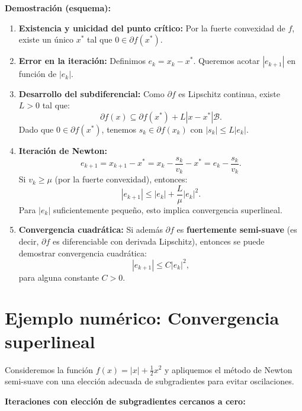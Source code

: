\documentclass[12pt]{book}
\theoremstyle{definition}
\theoremstyle{plain}
\theoremstyle{remark}
\begin{document}
\medskip
\textbf{Demostración (esquema):}

\begin{enumerate}
    \item \textbf{Existencia y unicidad del punto crítico:}
      Por la fuerte convexidad de \( f \), existe un único \( x^* \) tal que \( 0 \in \partial f(x^*) \).

    \item \textbf{Error en la iteración:}
      Definimos \( e_k = x_k - x^* \). Queremos acotar \( |e_{k+1}| \) en función de \( |e_k| \).

    \item \textbf{Desarrollo del subdiferencial:}
      Como \( \partial f \) es Lipschitz continua, existe \( L > 0 \) tal que:
      \[
      \partial f(x) \subseteq \partial f(x^*) + L |x - x^*| \mathcal{B}.
      \]
      Dado que \( 0 \in \partial f(x^*) \), tenemos \( s_k \in \partial f(x_k) \) con \( |s_k| \leq L |e_k| \).

    \item \textbf{Iteración de Newton:}
      \[
      e_{k+1} = x_{k+1} - x^* = x_k - \frac{s_k}{v_k} - x^* = e_k - \frac{s_k}{v_k}.
      \]
      Si \( v_k \geq \mu \) (por la fuerte convexidad), entonces:
      \[
      |e_{k+1}| \leq |e_k| + \frac{L}{\mu} |e_k|^2.
      \]
      Para \( |e_k| \) suficientemente pequeño, esto implica convergencia superlineal.

    \item \textbf{Convergencia cuadrática:}
      Si además \( \partial f \) es \textbf{fuertemente semi-suave} (es decir, \( \partial f \) es diferenciable con derivada Lipschitz), entonces se puede demostrar convergencia cuadrática:
      \[
      |e_{k+1}| \leq C |e_k|^2,
      \]
      para alguna constante \( C > 0 \).
\end{enumerate}

\section*{Ejemplo numérico: Convergencia superlineal}

Consideremos la función \( f(x) = |x| + \frac{1}{2} x^2 \) y apliquemos el método de Newton semi-suave con una elección adecuada de subgradientes para evitar oscilaciones.

\medskip
\textbf{Iteraciones con elección de subgradientes cercanos a cero:}
\end{document}
